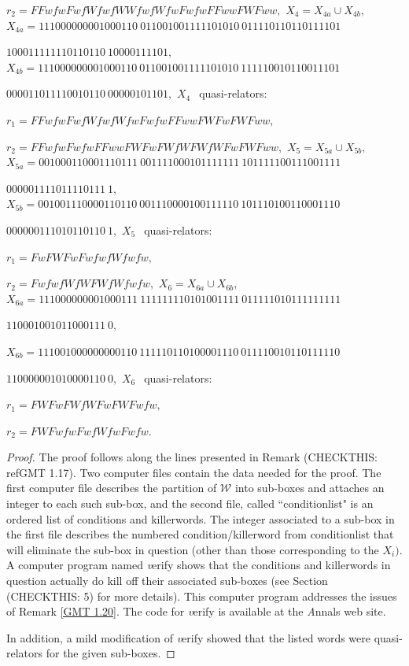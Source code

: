 \begin{proposition}
$r_2 = FFwfwFwfWfwfWWfwfWfwFwfwFFwwFWFww,$
\noindent $X_4 = X_{4a} \cup X_{4b},$
\noindent $X_{4a} = 
111000000001000110\ 
011001001111101010\ 
011110110110111101$\hfill

\hfill  
$100011111110110110\ 
10000111101,$
\noindent $X_{4b} = 
111000000001000110\ 
011001001111101010\ 
111110010110011101$\hfill

\hfill  
$000011011110010110\ 
00000101101,$
\noindent $X_4\ \ $ quasi\/{\textrm -}\/relators\/{\textrm :}

$r_1 = FFwfwFwfWfwfWfwFwfwFFwwFWFwFWFww,$

$r_2 = FFwfwFwfwFFwwFWFwFWfWFWfWFwFWFww,$
\noindent $X_5 = X_{5a} \cup X_{5b},$
\noindent $X_{5a} = 
001000110001110111\ 
001111000101111111\ 
101111100111001111$\hfill

\hfill 
$000001111011110111\ 1,$
\noindent  $X_{5b} = 
001001110000110110\ 
001110000100111110\ 
101110100110001110$\hfill

\hfill  
$000000111010110110\ 1,$
\vglue4pt
\noindent $X_5\ \ $ quasi\/{\textrm -}\/relators\/{\textrm :}

$r_1 = FwFWFwFwfwfWfwfw,$

$r_2 = FwfwfWfWFWfWfwfw,$
\vfil
\noindent $X_6 = X_{6a} \cup X_{6b},$
\vfil
\noindent $X_{6a} = 
111000000001000111\ 
111111110101001111\ 
011111010111111111$\hfill

\hfill  
$110001001011000111\ 0,$

\noindent $X_{6b} = 
111001000000000110\ 
111110110100001110\ 
011110010110111110$\hfill

\hfill  
$110000001010000110\ 0,$
\vglue4pt
\noindent $X_6\ \ $ quasi\/{\textrm -}\/relators\/{\textrm :}\/

$r_1 = FWFwFWfWFwFWFwfw,$

$r_2 = FWFwfwFwfWfwFwfw.$
\end{proposition}

 
\begin{proof}{}  
The proof follows along the lines presented in Remark (CHECKTHIS: ref{GMT 1.17}).  
Two computer files contain the data needed for the proof.   
The first computer file describes the partition of ${\mathcal W}$ into
sub-boxes and attaches an integer to each such sub-box, 
and the second file, called ``conditionlist" is an ordered list of conditions and killerwords.
The integer associated to a sub-box in the first file describes the numbered condition/killerword from   conditionlist that will eliminate the sub-box
in question (other than those corresponding to the $X_i).$ A computer program named {\textit verify} shows
that the conditions and killerwords in question actually do kill off their associated sub-boxes (see Section (CHECKTHIS: 5) for more details).  This computer
program addresses the issues of Remark \ref{GMT 1.20}.  The code for {\textit
verify} is available at the {\textit Annals} web site. 

In addition, a mild modification of {\textit verify} showed that the listed words were quasi-relators for the given sub-boxes. 
\end{proof}



